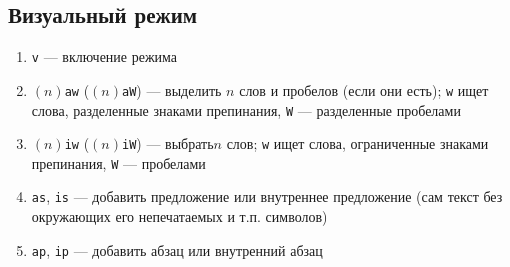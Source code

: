 \documentclass[a4paper,10pt, twocolumn]{article}
\newcommand*{\cod}[1]{\texttt{#1}}
\begin{document}
\subsection{Визуальный режим}
\begin{enumerate}
    \item \cod{v} --- включение режима
    \item $(n)$\cod{aw} ($(n)$\cod{aW}) --- выделить $n$ слов и пробелов (если они есть); \cod{w} ищет слова, разделенные знаками препинания, \cod{W} --- разделенные пробелами
    \item $(n)$\cod{iw} ($(n)$\cod{iW}) --- выбрать$n$ слов; \cod{w} ищет слова, ограниченные знаками препинания, \cod{W} --- пробелами
    \item \cod{as}, \cod{is} --- добавить предложение или внутреннее предложение (сам текст без окружающих его непечатаемых и т.п. символов)
    \item \cod{ap}, \cod{ip} --- добавить абзац или внутренний абзац
\end{enumerate}
\end{document}
